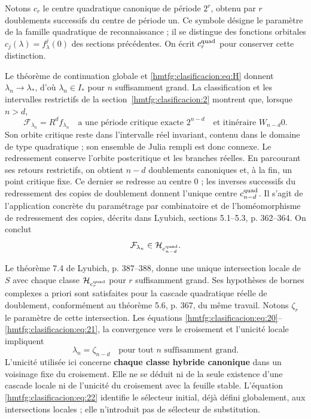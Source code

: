 Notons \(c_r\) le centre quadratique canonique de période \(2^r\), obtenu par \(r\) doublements successifs du centre de période un. Ce symbole désigne le paramètre de la famille quadratique de reconnaissance ; il se distingue des fonctions orbitales \(c_j(\lambda)=f_\lambda^j(0)\) des sections précédentes. On écrit \(c_r^{\rm quad}\) pour conserver cette distinction.

Le théorème de continuation globale et \eqref{hmtfg:clasificacion:eq:H} donnent \(\lambda_n\to\lambda_*\), d’où \(\lambda_n\in I_*\) pour \(n\) suffisamment grand. La classification et les intervalles restrictifs de la section~\ref{hmtfg:clasificacion:2} montrent que, lorsque \(n>d\),
\begin{equation}
\mathcal F_{\lambda_n}=R^df_{\lambda_n}
\quad\text{a une période critique exacte }2^{n-d}
\quad\text{et itinéraire }W_{n-d}0.
\label{hmtfg:clasificacion:eq:20}
\end{equation}
Son orbite critique reste dans l’intervalle réel invariant, contenu dans le domaine de type quadratique ; son ensemble de Julia rempli est donc connexe. Le redressement conserve l’orbite postcritique et les branches réelles. En parcourant ses retours restrictifs, on obtient \(n-d\) doublements canoniques et, à la fin, un point critique fixe. Ce dernier se redresse au centre \(0\) ; les inverses successifs du redressement des copies de doublement donnent l’unique centre \(c_{n-d}^{\rm quad}\). Il s’agit de l’application concrète du paramétrage par combinatoire et de l’homéomorphisme de redressement des copies, décrits dans Lyubich, sections 5.1–5.3, p. 362–364. On conclut
\begin{equation}
\mathcal F_{\lambda_n}\in\mathcal H_{c_{n-d}^{\rm quad}}.
\label{hmtfg:clasificacion:eq:21}
\end{equation}

Le théorème 7.4 de Lyubich, p. 387–388, donne une unique intersection locale de \(S\) avec chaque classe \(\mathcal H_{c_r^{\rm quad}}\) pour \(r\) suffisamment grand. Ses hypothèses de bornes complexes a priori sont satisfaites pour la cascade quadratique réelle de doublement, conformément au théorème 5.6, p. 367, du même travail. Notons \(\zeta_r\) le paramètre de cette intersection. Les équations \eqref{hmtfg:clasificacion:eq:20}–\eqref{hmtfg:clasificacion:eq:21}, la convergence vers le croisement et l’unicité locale impliquent
\begin{equation}
\boxed{\lambda_n=\zeta_{n-d}\quad\text{pour tout }n\text{ suffisamment grand}.}
\label{hmtfg:clasificacion:eq:22}
\end{equation}
L’unicité utilisée ici concerne \textbf{chaque classe hybride canonique} dans un voisinage fixe du croisement. Elle ne se déduit ni de la seule existence d’une cascade locale ni de l’unicité du croisement avec la feuille stable. L’équation \eqref{hmtfg:clasificacion:eq:22} identifie le sélecteur initial, déjà défini globalement, aux intersections locales ; elle n’introduit pas de sélecteur de substitution.

